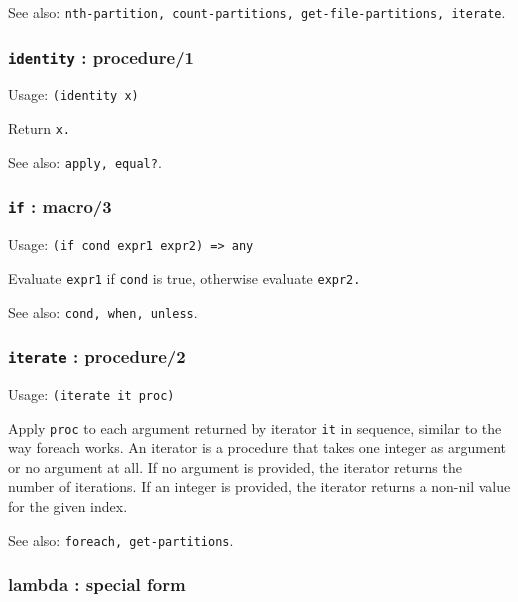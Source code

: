 \documentclass[
]{article}
\newcommand{\passthrough}[1]{#1}
\begin{document}
See also:
\passthrough{\lstinline!nth-partition, count-partitions, get-file-partitions, iterate!}.

\hypertarget{identity-procedure1}{%
\subsubsection{\texorpdfstring{\texttt{identity} :
procedure/1}{identity : procedure/1}}\label{identity-procedure1}}

Usage: \passthrough{\lstinline!(identity x)!}

Return \passthrough{\lstinline!x.!}

See also: \passthrough{\lstinline!apply, equal?!}.

\hypertarget{if-macro3}{%
\subsubsection{\texorpdfstring{\texttt{if} :
macro/3}{if : macro/3}}\label{if-macro3}}

Usage: \passthrough{\lstinline!(if cond expr1 expr2) => any!}

Evaluate \passthrough{\lstinline!expr1!} if
\passthrough{\lstinline!cond!} is true, otherwise evaluate
\passthrough{\lstinline!expr2.!}

See also: \passthrough{\lstinline!cond, when, unless!}.

\hypertarget{iterate-procedure2}{%
\subsubsection{\texorpdfstring{\texttt{iterate} :
procedure/2}{iterate : procedure/2}}\label{iterate-procedure2}}

Usage: \passthrough{\lstinline!(iterate it proc)!}

Apply \passthrough{\lstinline!proc!} to each argument returned by
iterator \passthrough{\lstinline!it!} in sequence, similar to the way
foreach works. An iterator is a procedure that takes one integer as
argument or no argument at all. If no argument is provided, the iterator
returns the number of iterations. If an integer is provided, the
iterator returns a non-nil value for the given index.

See also: \passthrough{\lstinline!foreach, get-partitions!}.

\hypertarget{lambda-special-form}{%
\subsubsection{lambda : special form}\label{lambda-special-form}}
\end{document}
